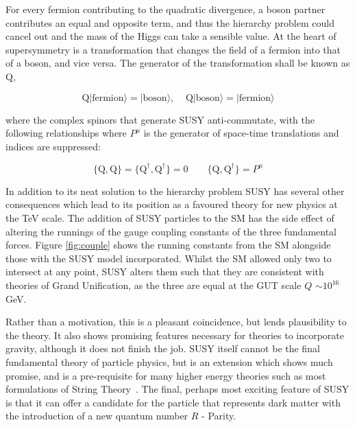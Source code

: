 For every fermion contributing to the quadratic divergence, a boson partner contributes an equal and opposite term, and thus the hierarchy problem could cancel out and the mass of the Higgs can take a sensible value. At the heart of supersymmetry is a transformation that changes the field of a fermion into that of a boson, and vice versa. The generator of the transformation shall be known as Q,

\begin{equation}
\textrm{Q}|\textrm{fermion}\rangle = |\textrm{boson}\rangle,  \; \; \; \;  \textrm{Q}|\textrm{boson}\rangle = |\textrm{fermion}\rangle  
\label{eqn:Q}
\end{equation}

where the complex spinors that generate SUSY anti-commutate, with the following relationships where $P^{\mu}$ is the generator of space-time translations and indices are suppressed:


\begin{equation}
\{\textrm{Q},\textrm{Q}\} = \{\textrm{Q}^{\dagger},\textrm{Q}^{\dagger}\} = 0 \qquad \{\textrm{Q},\textrm{Q}^{\dagger}\} = P^{\mu} 
\end{equation} 


In addition to its neat solution to the hierarchy problem SUSY has several other consequences which lead to its position as a favoured theory for new physics at the TeV scale. The addition of SUSY particles to the SM has the side effect of altering the runnings of the gauge coupling constants of the three fundamental forces. Figure \ref{fig:couple} shows the running constants from the SM alongside those with the SUSY model incorporated. Whilst the SM allowed only two to intersect at any point, SUSY alters them such that they are consistent with theories of Grand Unification, as the three are equal at the GUT scale $Q$ $\sim 10^{16}$ GeV. 

Rather than a motivation, this is a pleasant coincidence, but lends plausibility to the theory. It also shows promising features necessary for theories to incorporate gravity, although it does not finish the job. SUSY itself cannot be the final fundamental theory of particle physics, but is an extension which shows much promise, and is a pre-requisite for many higher energy theories such as most formulations of String Theory~\cite{Dine}. The final, perhaps most exciting feature of SUSY is that it can offer a candidate for the particle that represents dark matter with the introduction of a new quantum number $R$ - Parity. 

